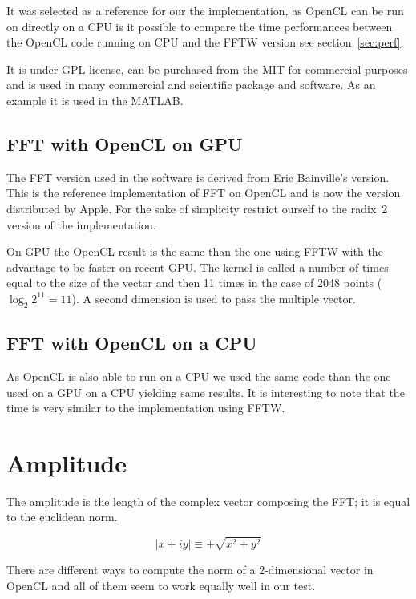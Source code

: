    	It was selected as a reference for our the implementation, as \gls{OpenCL} can be run on directly on a \gls{CPU} is it possible to compare the time performances between the \gls{OpenCL} code running on \gls{CPU} and the \gls{FFTW} version see section~\ref{sec:perf}.

   	It is under GPL license, can be purchased from the \gls{MIT} for commercial purposes and is used in many commercial and scientific package and software. As an example it is used in the MATLAB.

   	\subsection{FFT with OpenCL on GPU}

   	The \gls{FFT} version used in the software is derived from Eric Bainville's version. This is the reference implementation of \gls{FFT} on \gls{OpenCL} and is now the version distributed by Apple\cite{bainville11}. For the sake of simplicity restrict ourself to the radix~2 version of the implementation.

   	On \gls{GPU} the \gls{OpenCL} result is the same than the one using \gls{FFTW} with the advantage to be faster on recent \gls{GPU}. The kernel is called a number of times equal to the size of the vector and then 11 times in the case of 2048 points ($\log_{2}{2^{11}} = 11$). A second dimension is used to pass the multiple vector.

   	\subsection{FFT with OpenCL on a CPU}

   	As \gls{OpenCL} is also able to run on a \gls{CPU} we used the same code than the one used on a \gls{GPU} on a \gls{CPU} yielding same results. It is interesting to note that the time is very similar to the implementation using \gls{FFTW}.

\section{Amplitude}
\label{sec:amplitude}

The amplitude is the length of the complex vector composing the \gls{FFT}; it is equal to the euclidean norm. 

$$ \mid x + i y \mid \equiv +\sqrt{x^2 + y^2}$$ 

There are different ways to compute the norm of a 2-dimensional vector in \gls{OpenCL} and all of them seem to work equally well in our test.

